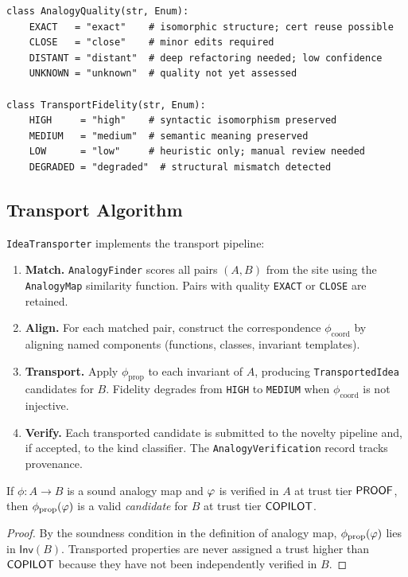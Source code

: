 \documentclass[11pt]{article}
\newcommand{\Inv}{\mathsf{Inv}}            %
\newcommand{\alg}[1]{\texttt{\small #1}}   %
\begin{document}
\begin{lstlisting}[style=jugeo-python, caption={%
  AnalogyMap and transport quality enumerations.}]
class AnalogyQuality(str, Enum):
    EXACT   = "exact"    # isomorphic structure; cert reuse possible
    CLOSE   = "close"    # minor edits required
    DISTANT = "distant"  # deep refactoring needed; low confidence
    UNKNOWN = "unknown"  # quality not yet assessed

class TransportFidelity(str, Enum):
    HIGH     = "high"    # syntactic isomorphism preserved
    MEDIUM   = "medium"  # semantic meaning preserved
    LOW      = "low"     # heuristic only; manual review needed
    DEGRADED = "degraded"  # structural mismatch detected
\end{lstlisting}

\subsection{Transport Algorithm}

\alg{IdeaTransporter} implements the transport pipeline:

\begin{enumerate}[label=\arabic*.,leftmargin=*]
  \item \textbf{Match.}  \alg{AnalogyFinder} scores all pairs
    $(A, B)$ from the site using the \texttt{AnalogyMap} similarity
    function.  Pairs with quality \alg{EXACT} or \alg{CLOSE} are
    retained.

  \item \textbf{Align.}  For each matched pair, construct
    the correspondence $\phi_{\mathrm{coord}}$ by aligning
    named components (functions, classes, invariant templates).

  \item \textbf{Transport.}  Apply $\phi_{\mathrm{prop}}$ to each
    invariant of $A$, producing \texttt{TransportedIdea} candidates
    for $B$.  Fidelity degrades from \alg{HIGH} to \alg{MEDIUM}
    when $\phi_{\mathrm{coord}}$ is not injective.

  \item \textbf{Verify.}  Each transported candidate is submitted to
    the novelty pipeline and, if accepted, to the kind classifier.
    The \texttt{AnalogyVerification} record tracks provenance.
\end{enumerate}

\begin{proposition}\label{prop:transport-sound}
If $\phi: A \to B$ is a sound analogy map and $\varphi$ is verified
in $A$ at trust tier $\mathsf{PROOF}$, then $\phi_{\mathrm{prop}}(\varphi)$
is a valid \emph{candidate} for $B$ at trust tier $\mathsf{COPILOT}$.
\end{proposition}
\begin{proof}
By the soundness condition in the definition of analogy map,
$\phi_{\mathrm{prop}}(\varphi)$ lies in $\Inv(B)$.  Transported
properties are never assigned a trust higher than $\mathsf{COPILOT}$
because they have not been independently verified in $B$.
\end{proof}
\end{document}
